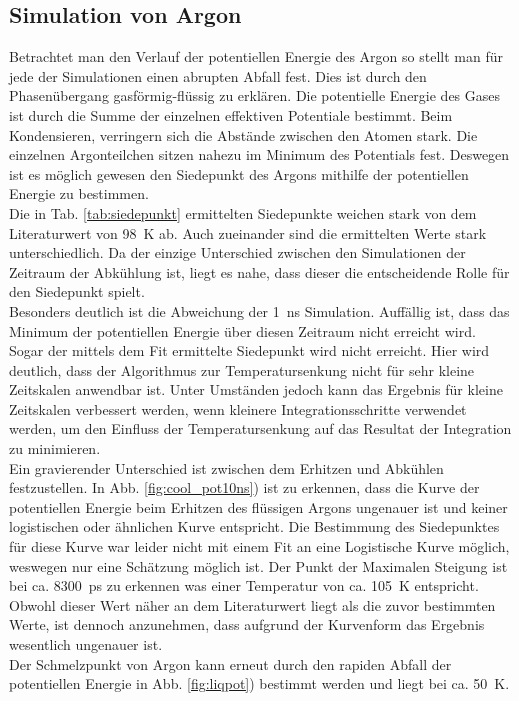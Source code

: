 \subsection{Simulation von Argon}
Betrachtet man den Verlauf der potentiellen Energie des Argon so stellt man für jede der Simulationen einen abrupten Abfall fest.
Dies ist durch den Phasenübergang gasförmig-flüssig zu erklären.
Die potentielle Energie des Gases ist durch die Summe der einzelnen effektiven Potentiale bestimmt.
Beim Kondensieren, verringern sich die Abstände zwischen den Atomen stark. Die einzelnen Argonteilchen sitzen nahezu im Minimum des Potentials fest.
Deswegen ist es möglich gewesen den Siedepunkt des Argons mithilfe der potentiellen Energie zu bestimmen.
\\ \noindent
Die in Tab. \ref{tab:siedepunkt} ermittelten Siedepunkte weichen stark von dem Literaturwert von 98~K \cite{phasediagram} ab. Auch zueinander sind die ermittelten Werte stark unterschiedlich.
Da der einzige Unterschied zwischen den Simulationen der Zeitraum der Abkühlung ist, liegt es nahe, dass dieser die entscheidende Rolle für den Siedepunkt spielt.
\\ \noindent
Besonders deutlich ist die Abweichung der 1~ns Simulation. Auffällig ist, dass das Minimum der potentiellen Energie über diesen Zeitraum nicht erreicht wird.
Sogar der mittels dem Fit ermittelte Siedepunkt wird nicht erreicht.
Hier wird deutlich, dass der Algorithmus zur Temperatursenkung nicht für sehr kleine Zeitskalen anwendbar ist.
Unter Umständen jedoch kann das Ergebnis für kleine Zeitskalen verbessert werden, wenn kleinere Integrationsschritte verwendet werden, um den Einfluss der Temperatursenkung auf das Resultat der Integration zu minimieren.
\\ \noindent
Ein gravierender Unterschied ist zwischen dem Erhitzen und Abkühlen festzustellen. In Abb. \ref{fig:cool_pot10ns}) ist zu erkennen, dass die Kurve der potentiellen Energie beim Erhitzen des flüssigen Argons ungenauer ist und keiner logistischen oder ähnlichen Kurve entspricht.
Die Bestimmung des Siedepunktes für diese Kurve war leider nicht mit einem Fit an eine Logistische Kurve möglich, weswegen nur eine Schätzung möglich ist.
Der Punkt der Maximalen Steigung ist bei ca. 8300~ps zu erkennen was einer Temperatur von ca. 105~K entspricht.
Obwohl dieser Wert näher an dem Literaturwert liegt als die zuvor bestimmten Werte, ist dennoch anzunehmen, dass aufgrund der Kurvenform das Ergebnis wesentlich ungenauer ist.
\\ \noindent
Der Schmelzpunkt von Argon kann erneut durch den rapiden Abfall der potentiellen Energie in Abb. \ref{fig:liqpot}) bestimmt werden und liegt bei ca. 50~K.
